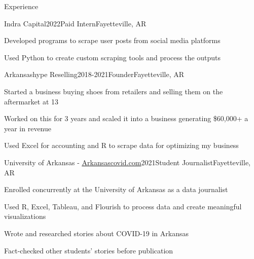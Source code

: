 \documentclass{resume}
\begin{document}
    \begin{rSection}{Experience}
        \begin{rSubsection}{Indra Capital}{2022}{Paid Intern}{Fayetteville, AR}
            \item Developed programs to scrape user posts from social media platforms
            \item Used Python to create custom scraping tools and process the outputs
        \end{rSubsection}

        \begin{rSubsection}{Arkansashype Reselling}{2018-2021}{Founder}{Fayetteville, AR}
            \item Started a business buying shoes from retailers and selling them on the aftermarket at 13
            \item Worked on this for 3 years and scaled it into a business generating \$60,000+ a year in revenue
            \item Used Excel for accounting and R to scrape data for optimizing my business
        \end{rSubsection}

        \begin{rSubsection}{University of Arkansas - \href{https://web.archive.org/web/20210426215910/https://arkansascovid.com/}{\underline{Arkansascovid.com}}}{2021}{Student Journalist}{Fayetteville, AR}
            \item Enrolled concurrently at the University of Arkansas as a data journalist
            \item Used R, Excel, Tableau, and Flourish to process data and create meaningful visualizations
            \item Wrote and researched stories about COVID-19 in Arkansas
            \item Fact-checked other students' stories before publication
        \end{rSubsection}
    \end{rSection}
\end{document}
